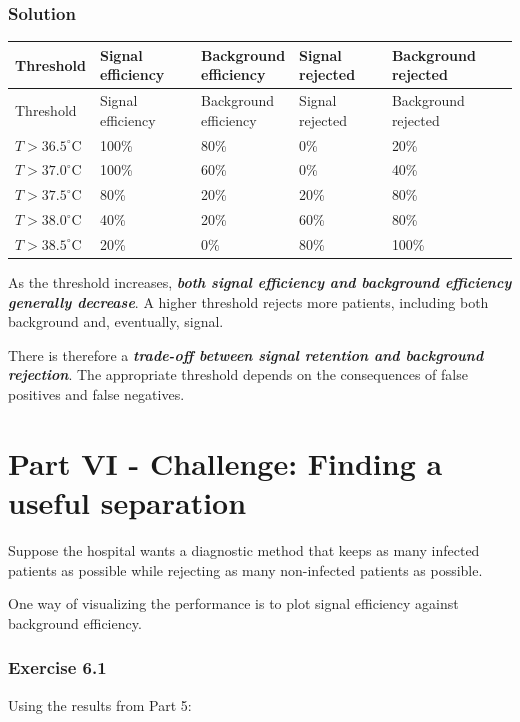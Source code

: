 \documentclass[10pt]{article}
\begin{document}
\subsubsection*{Solution}
\begingroup
\small
\setlength{\tabcolsep}{4pt}
\begin{longtable}{l|l|l|l|l}
Threshold & Signal efficiency & \shortstack[l]{Background \\ efficiency} & Signal rejected & Background rejected \\[1.5pt]
\hline
\endfirsthead
Threshold & Signal efficiency & \shortstack[l]{Background \\ efficiency} & Signal rejected & Background rejected \\[1.5pt]
\hline
\endhead
$T>36.5^\circ\mathrm{C}$ & 100\% & 80\% & 0\% & 20\% \\[1.5pt]
$T>37.0^\circ\mathrm{C}$ & 100\% & 60\% & 0\% & 40\% \\[1.5pt]
$T>37.5^\circ\mathrm{C}$ & 80\% & 20\% & 20\% & 80\% \\[1.5pt]
$T>38.0^\circ\mathrm{C}$ & 40\% & 20\% & 60\% & 80\% \\[1.5pt]
$T>38.5^\circ\mathrm{C}$ & 20\% & 0\% & 80\% & 100\% \\[1.5pt]
\end{longtable}
\endgroup
As the threshold increases, \textbf{\textit{both signal efficiency and background efficiency generally decrease}}. A higher threshold rejects more patients, including both background and, eventually, signal.

There is therefore a \textbf{\textit{trade-off between signal retention and background rejection}}. The appropriate threshold depends on the consequences of false positives and false negatives.

\par\endgroup

\clearpage
\section*{Part VI - Challenge: Finding a useful separation}
Suppose the hospital wants a diagnostic method that keeps as many infected patients as possible while rejecting as many non-infected patients as possible.

One way of visualizing the performance is to plot signal efficiency against background efficiency.

\subsubsection*{Exercise 6.1}
Using the results from Part 5:
\end{document}
